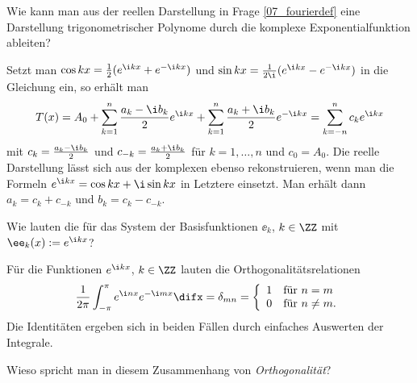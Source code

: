   \begin{frage}
    Wie kann man aus der reellen Darstellung 
    in Frage \ref{07_fourierdef} eine Darstellung trigonometrischer 
    Polynome durch die komplexe Exponentialfunktion ableiten?
  \end{frage}

  \begin{antwort}
    Setzt man $\cos kx=\frac{1}{2}(e^{\i kx}+e^{-\i kx})$ und 
    $\sin kx = \frac{1}{2\i} (e^{\i kx}-e^{-\i kx})$ in die Gleichung 
    ein, so erhält man 
    \begin{equation} \label{t2}
      T(x)=A_0+\sum_{k=1}^n \frac{a_k-\i b_k}{2}e^{\i kx}
      +\sum_{k=1}^n \frac{a_k+\i b_k}{2} e^{-\i kx} =
      \sum_{k=-n}^n c_k e^{\i kx}\notag
    \end{equation}
    mit $c_k=\frac{a_k-\i b_k}{2}$ und 
    $c_{-k}=\frac{a_k+\i b_k}{2}$ für $k=1,\ldots,n$ und $c_0=A_0$. 
    Die reelle Darstellung 
    lässt sich aus der komplexen ebenso rekonstruieren, 
    wenn man die Formeln $e^{\i kx}=\cos kx +\i \sin kx$ in Letztere einsetzt. 
    Man erhält dann $a_k=c_k+c_{-k}$ und 
    $b_k=c_k-c_{-k}$.\AntEnd
  \end{antwort}

  \begin{frage}\label{07_ortho}
    Wie lauten die  für das System der 
    Basisfunktionen $\ee_k$, $k\in \ZZ$ mit 
    $\ee_k(x) := e^{\i kx}$?
  \end{frage}

  \begin{antwort}
    Für die Funktionen $e^{\i kx}$, $k\in \ZZ$ lauten die 
    Orthogonalitätsrelationen
    \begin{equation}\label{orth}
      \frac{1}{2\pi} \int_{-\pi}^\pi e^{\i nx} e^{-\i mx} \difx = \delta_{mn}=
      \left\{
        \begin{array}{ll}
          1 & \text{für $n=m$} \\
          0 & \text{für $n\not=m$.}
        \end{array}
      \right. \notag
    \end{equation}
    Die Identitäten ergeben sich in beiden Fällen durch einfaches 
    Auswerten der Integrale.
    \AntEnd
  \end{antwort}

  \begin{frage}\label{07_skalar}
    Wieso spricht man in diesem Zusammenhang von \emph{Orthogonalität}?
  \end{frage}

